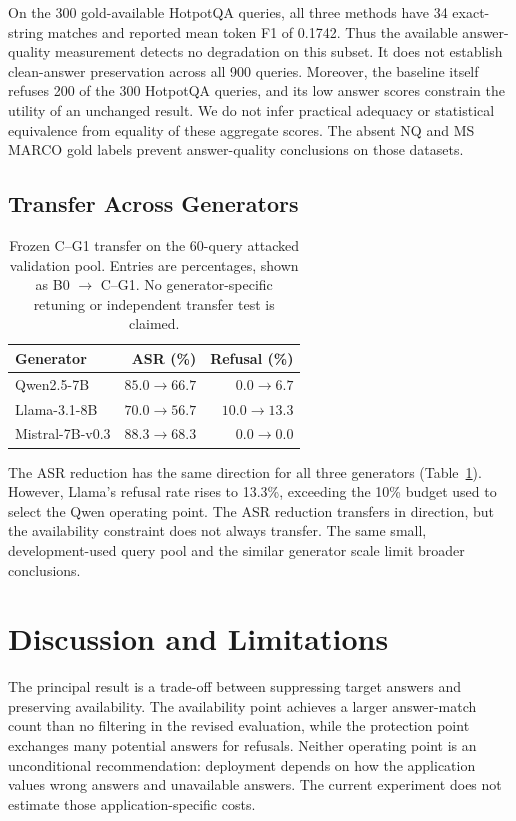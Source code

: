 \documentclass[sigconf]{aamas}
\begin{document}
On the 300 gold-available HotpotQA queries, all three methods have 34 exact-string matches and reported mean token F1 of 0.1742. Thus the available answer-quality measurement detects no degradation on this subset. It does not establish clean-answer preservation across all 900 queries. Moreover, the baseline itself refuses 200 of the 300 HotpotQA queries, and its low answer scores constrain the utility of an unchanged result. We do not infer practical adequacy or statistical equivalence from equality of these aggregate scores. The absent NQ and MS MARCO gold labels prevent answer-quality conclusions on those datasets.

\subsection{Transfer Across Generators}
\begin{table}[t]
\caption{Frozen C--G1 transfer on the 60-query attacked validation pool. Entries are percentages, shown as B0 $\rightarrow$ C--G1. No generator-specific retuning or independent transfer test is claimed.}
\label{tab:transfer}
\centering
\begin{tabular}{lrr}
\toprule
Generator & ASR (\%) & Refusal (\%)\\
\midrule
Qwen2.5-7B & $85.0\rightarrow66.7$ & $0.0\rightarrow6.7$\\
Llama-3.1-8B & $70.0\rightarrow56.7$ & $10.0\rightarrow13.3$\\
Mistral-7B-v0.3 & $88.3\rightarrow68.3$ & $0.0\rightarrow0.0$\\
\bottomrule
\end{tabular}
\end{table}
The ASR reduction has the same direction for all three generators (Table~\ref{tab:transfer}). However, Llama's refusal rate rises to 13.3\%, exceeding the 10\% budget used to select the Qwen operating point. The ASR reduction transfers in direction, but the availability constraint does not always transfer. The same small, development-used query pool and the similar generator scale limit broader conclusions.

\section{Discussion and Limitations}
The principal result is a trade-off between suppressing target answers and preserving availability. The availability point achieves a larger answer-match count than no filtering in the revised evaluation, while the protection point exchanges many potential answers for refusals. Neither operating point is an unconditional recommendation: deployment depends on how the application values wrong answers and unavailable answers. The current experiment does not estimate those application-specific costs.
\end{document}
